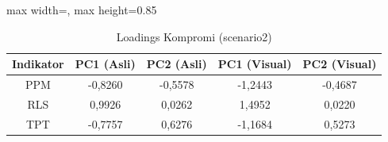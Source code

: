 \begin{table}[H]
\centering
\caption{Loadings Kompromi (scenario2)} \label{tab:sample2loadings}
\begin{adjustbox}{max width=\textwidth, max height=0.85\textheight}
\begin{tabular}{|c|c|c|c|c|}
\hline
\textbf{Indikator} & \textbf{PC1 (Asli)} & \textbf{PC2 (Asli)} & \textbf{PC1 (Visual)} & \textbf{PC2 (Visual)} \\
\hline
PPM & -0,8260 & -0,5578 & -1,2443 & -0,4687 \\
RLS & 0,9926 & 0,0262 & 1,4952 & 0,0220 \\
TPT & -0,7757 & 0,6276 & -1,1684 & 0,5273 \\
\hline
\end{tabular}
\end{adjustbox}
\end{table}